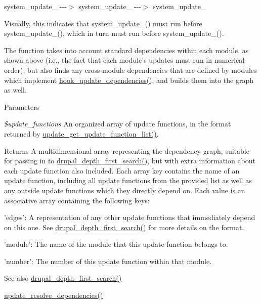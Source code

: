 system\_\-update\_ -\/-\/-\/$>$ system\_\-update\_ -\/-\/-\/$>$ system\_\-update\_

Visually, this indicates that system\_\-update\_() must run before system\_\-update\_(), which in turn must run before system\_\-update\_().

The function takes into account standard dependencies within each module, as shown above (i.e., the fact that each module's updates must run in numerical order), but also finds any cross-\/module dependencies that are defined by modules which implement \hyperlink{group__hooks_ga23e9e019b7ec64d95bafbeaffd295483}{hook\_\-update\_\-dependencies()}, and builds them into the graph as well.


\begin{DoxyParams}{Parameters}
\item[{\em \$update\_\-functions}]An organized array of update functions, in the format returned by \hyperlink{update_8inc_ad268e1662e1d06a85f3d51dfec9955b2}{update\_\-get\_\-update\_\-function\_\-list()}.\end{DoxyParams}
\begin{DoxyReturn}{Returns}
A multidimensional array representing the dependency graph, suitable for passing in to \hyperlink{graph_8inc_ab1e9257090d35212bd3dd3eba7706471}{drupal\_\-depth\_\-first\_\-search()}, but with extra information about each update function also included. Each array key contains the name of an update function, including all update functions from the provided list as well as any outside update functions which they directly depend on. Each value is an associative array containing the following keys:
\begin{DoxyItemize}
\item 'edges': A representation of any other update functions that immediately depend on this one. See \hyperlink{graph_8inc_ab1e9257090d35212bd3dd3eba7706471}{drupal\_\-depth\_\-first\_\-search()} for more details on the format.
\item 'module': The name of the module that this update function belongs to.
\item 'number': The number of this update function within that module.
\end{DoxyItemize}
\end{DoxyReturn}
\begin{DoxySeeAlso}{See also}
\hyperlink{graph_8inc_ab1e9257090d35212bd3dd3eba7706471}{drupal\_\-depth\_\-first\_\-search()} 

\hyperlink{update_8inc_aa931d6cdddc2e9e0ec96d240523056e9}{update\_\-resolve\_\-dependencies()} 
\end{DoxySeeAlso}
